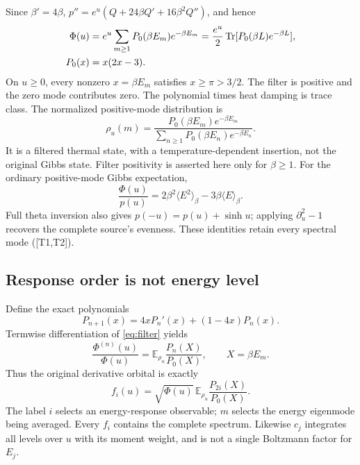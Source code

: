 \documentclass[11pt,letterpaper]{article}
\numberwithin{equation}{section}
\theoremstyle{remark}
\DeclareMathOperator{\Tr}{Tr}
\newcommand{\E}{\mathbb E}
\newcommand{\ev}[1]{\textsf{[#1]}}
\begin{document}
Since $\beta'=4\beta$,
$p''=e^u(Q+24\beta Q'+16\beta^2Q'')$, and hence
\begin{align}
 \Phi(u)&=e^u\sum_{m\ge1}P_0(\beta E_m)e^{-\beta E_m}
 =\frac{e^u}{2}\Tr[P_0(\beta L)e^{-\beta L}],\notag\\
 P_0(x)&=x(2x-3). \label{eq:filter}
\end{align}
On $u\ge0$, every nonzero $x=\beta E_m$ satisfies $x\ge\pi>3/2$.
The filter is positive and the zero mode contributes zero. The
polynomial times heat damping is trace class. The normalized
positive-mode distribution is
\begin{equation}
 \rho_u(m)=\frac{P_0(\beta E_m)e^{-\beta E_m}}
                 {\sum_{n\ge1}P_0(\beta E_n)e^{-\beta E_n}}.
 \label{eq:thermalstate}
\end{equation}
It is a filtered thermal state, with a temperature-dependent insertion,
not the original Gibbs state. Filter positivity is asserted here only
for $\beta\ge1$. For the ordinary positive-mode Gibbs expectation,
\begin{equation}
 \frac{\Phi(u)}{p(u)}=2\beta^2\langle E^2\rangle_\beta
                          -3\beta\langle E\rangle_\beta. \label{eq:energymean}
\end{equation}
Full theta inversion also gives $p(-u)=p(u)+\sinh u$; applying
$\partial_u^2-1$ recovers the complete source's evenness. These
identities retain every spectral mode (\ev{T1,T2}).

\subsection{Response order is not energy level}
Define the exact polynomials
\begin{equation}
 P_{n+1}(x)=4xP_n'(x)+(1-4x)P_n(x). \label{eq:recurrence}
\end{equation}
Termwise differentiation of \eqref{eq:filter} yields
\begin{equation}
 \frac{\Phi^{(n)}(u)}{\Phi(u)}
 =\E_{\rho_u}\frac{P_n(X)}{P_0(X)},\qquad X=\beta E_m.
 \label{eq:responseenergy}
\end{equation}
Thus the original derivative orbital is exactly
\begin{equation}
 f_i(u)=\sqrt{\Phi(u)}\,
       \E_{\rho_u}\frac{P_{2i}(X)}{P_0(X)}. \label{eq:orbitalenergy}
\end{equation}
The label $i$ selects an energy-response observable; $m$ selects the
energy eigenmode being averaged. Every $f_i$ contains the complete
spectrum. Likewise $c_j$ integrates all levels over $u$ with its
moment weight, and is not a single Boltzmann factor for $E_j$.
\end{document}
